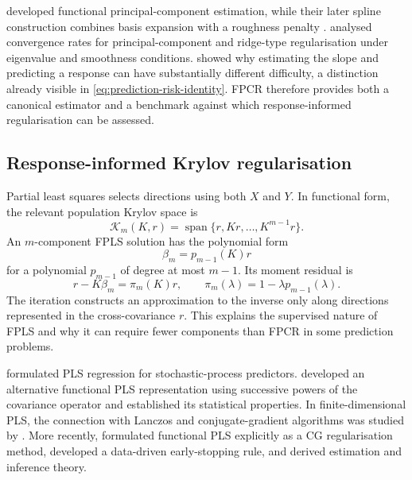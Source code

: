 \textcite{cardot_ferraty_sarda_1999} developed functional principal-component estimation, while their later spline construction combines basis expansion with a roughness penalty \parencite{cardot_ferraty_sarda_2003}. \textcite{hall_horowitz_2007} analysed convergence rates for principal-component and ridge-type regularisation under eigenvalue and smoothness conditions. \textcite{cai_hall_2006} showed why estimating the slope and predicting a response can have substantially different difficulty, a distinction already visible in \eqref{eq:prediction-risk-identity}. FPCR therefore provides both a canonical estimator and a benchmark against which response-informed regularisation can be assessed.

\subsection{Response-informed Krylov regularisation}

Partial least squares selects directions using both $X$ and $Y$. In functional form, the relevant population Krylov space is
\begin{equation}
    \mathcal K_m(K,r)
    =\operatorname{span}\{r,Kr,\ldots,K^{m-1}r\}.
    \label{eq:background-krylov-space}
\end{equation}
An $m$-component FPLS solution has the polynomial form
\begin{equation}
    \beta_m=p_{m-1}(K)r
    \label{eq:krylov-polynomial-solution}
\end{equation}
for a polynomial $p_{m-1}$ of degree at most $m-1$. Its moment residual is
\begin{equation}
    r-K\beta_m=\pi_m(K)r,
    \qquad
    \pi_m(\lambda)=1-\lambda p_{m-1}(\lambda).
    \label{eq:krylov-residual-polynomial}
\end{equation}
The iteration constructs an approximation to the inverse only along directions represented in the cross-covariance $r$. This explains the supervised nature of FPLS and why it can require fewer components than FPCR in some prediction problems.

\textcite{preda_saporta_2005} formulated PLS regression for stochastic-process predictors. \textcite{delaigle_hall_2012} developed an alternative functional PLS representation using successive powers of the covariance operator and established its statistical properties. In finite-dimensional PLS, the connection with Lanczos and conjugate-gradient algorithms was studied by \textcite{phatak_dehoog_2002}. More recently, \textcite{babii_carrasco_tsafack_2026} formulated functional PLS explicitly as a CG regularisation method, developed a data-driven early-stopping rule, and derived estimation and inference theory.

